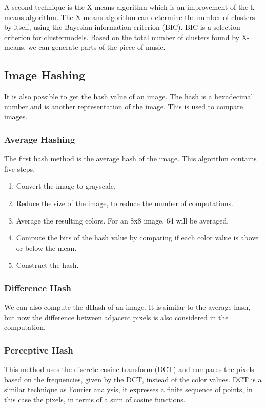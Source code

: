 \documentclass[12pt]{article}
\begin{document}
A second technique is the X-means algorithm which is an improvement of the k-means algorithm. The X-means algorithm can determine the number of clusters by itself, using the Bayesian information criterion (BIC). BIC is a selection criterion for clustermodels. Based on the total number of clusters found by X-means, we can generate parts of the piece of music.

\subsection{Image Hashing}
It is also possible to get the hash value of an image. The hash is a hexadecimal number and is another representation of the image. This is used to compare images. 

\subsubsection{Average Hashing}
The first hash method is the average hash of the image. This algorithm contains five steps.

\begin{enumerate}
        \item Convert the image to grayscale. 
        \item Reduce the size of the image, to reduce the number of computations.
        \item Average the resulting colors. For an 8x8 image, 64 will be averaged.
        \item Compute the bits of the hash value by comparing if each color value is above or below the mean.
        \item Construct the hash.
\end{enumerate}

\subsubsection{Difference Hash}
We can also compute the dHash of an image. It is similar to the average hash, but now the difference between adjacent pixels is also considered in the computation.

\subsubsection{Perceptive Hash}
This method uses the discrete cosine transform (DCT) and compares the pixels based on the frequencies, given by the DCT, instead of the color values.
DCT is a similar technique as Fourier analysis, it expresses a finite sequence of points, in this case the pixels, in terms of a sum of cosine functions.
\end{document}
